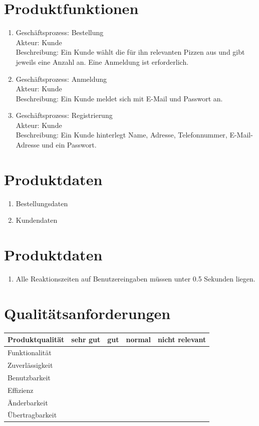 \section{Produktfunktionen}
\begin{enumerate}[/LF10/]
	\item Geschäftsprozess: Bestellung\\
	Akteur: Kunde\\
	Beschreibung: Ein Kunde wählt die für ihn relevanten Pizzen aus und gibt jeweils eine Anzahl an. Eine Anmeldung ist erforderlich.
	\item Geschäftsprozess: Anmeldung\\
	Akteur: Kunde\\
	Beschreibung: Ein Kunde meldet sich mit E-Mail und Passwort an.
	\item Geschäftsprozess: Registrierung\\
	Akteur: Kunde\\
	Beschreibung: Ein Kunde hinterlegt Name, Adresse, Telefonnummer, E-Mail-Adresse und ein Passwort.
\end{enumerate}
\section{Produktdaten}
\begin{enumerate}[/LD10/]
	\item Bestellungsdaten
	\item Kundendaten
\end{enumerate}
\section{Produktdaten}
\begin{enumerate}[/LL10/]
	\item Alle Reaktionszeiten auf Benutzereingaben müssen unter 0.5  Sekunden liegen.
\end{enumerate}
\section{Qualitätsanforderungen}
\begin{tabular}{l|cccc}
	Produktqualität&sehr gut&gut&normal&nicht relevant\\\hline
	Funktionalität&&&\texttimes&\\
	Zuverlässigkeit&&\texttimes&&\\
	Benutzbarkeit&\texttimes&&&\\
	Effizienz&&&&\texttimes\\
	Änderbarkeit&&&\texttimes&\\
	Übertragbarkeit&&&&\texttimes
\end{tabular}
